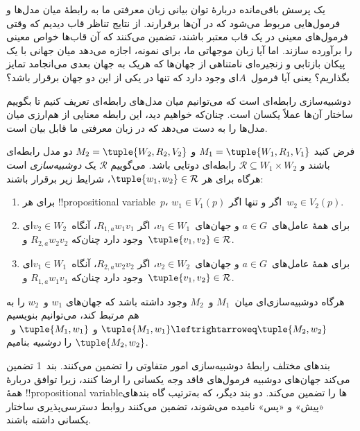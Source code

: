 \documentclass[../../../include/open-logic-section]{subfiles}
\begin{document}


یک پرسش باقی‌مانده دربارهٔ توان بیانی زبان معرفتی ما به رابطهٔ میان
مدل‌ها و فرمول‌هایی مربوط می‌شود که در آن‌ها برقرارند. از نتایج تناظر
قاب دیدیم که وقتی فرمول‌های معینی در یک قاب معتبر باشند، تضمین می‌کنند
که آن قاب‌ها خواص معینی را برآورده سازند. اما آیا زبان موجهاتی ما، برای
نمونه، اجازه می‌دهد میان جهانی با یک پیکان بازتابی و زنجیره‌ای نامتناهی
از جهان‌ها که هریک به جهان بعدی می‌انجامد تمایز بگذاریم؟ یعنی آیا
فرمول~$A$ای وجود دارد که تنها در یکی از این دو جهان برقرار باشد؟

دوشبیه‌سازی رابطه‌ای است که می‌توانیم میان مدل‌های رابطه‌ای تعریف کنیم
تا بگوییم ساختار آن‌ها عملاً یکسان است. چنان‌که خواهیم دید، این رابطه
معنایی از هم‌ارزی میان مدل‌ها را به دست می‌دهد که در زبان معرفتی ما
قابل بیان است.

\begin{defn}
فرض کنید $M_1 = \tuple{W_1, R_1, V_1}$ و
$M_2 = \tuple{W_2, R_2, V_2}$ دو مدل رابطه‌ای باشند و
$\mathcal{R} \subseteq W_1 \times W_2$ رابطه‌ای دوتایی باشد. می‌گوییم
$\mathcal{R}$ یک \emph{دوشبیه‌سازی} است هرگاه برای هر
$\tuple{w_1, w_2} \in \mathcal{R}$، شرایط زیر برقرار باشند:

\begin{enumerate}
  \item برای هر !!{propositional variable}~$p$،
  $w_1 \in V_1(p)$ اگر و تنها اگر~$w_2 \in V_2(p)$.
  \item برای همهٔ عامل‌های~$a \in G$ و جهان‌های~$v_1 \in W_1$، اگر
  $R_{1,a} w_1 v_1$، آنگاه~$v_2 \in W_2$ای وجود دارد چنان‌که
  $R_{2,a} w_2 v_2$ و~$\tuple{v_1, v_2} \in \mathcal{R}$.
  \item برای همهٔ عامل‌های~$a \in G$ و جهان‌های~$v_2 \in W_2$، اگر
   $R_{2,a} w_2 v_2$، آنگاه~$v_1 \in W_1$ای وجود دارد چنان‌که
   $R_{1,a} w_1 v_1$ و~$\tuple{v_1, v_2} \in \mathcal{R}$.
\end{enumerate}

هرگاه دوشبیه‌سازی‌ای میان~$M_1$ و~$M_2$ وجود داشته باشد که جهان‌های
$w_1$ و~$w_2$ را به هم مرتبط کند، می‌توانیم بنویسیم
$\tuple{M_1, w_1} \leftrightarroweq \tuple{M_2, w_2}$ و
$\tuple{M_1, w_1}$ و~$\tuple{M_2, w_2}$ را \emph{دوشبیه} بنامیم.
\end{defn}

بندهای مختلف رابطهٔ دوشبیه‌سازی امور متفاوتی را تضمین می‌کنند. بند~1
تضمین می‌کند جهان‌های دوشبیه فرمول‌های فاقد وجه یکسانی را ارضا کنند،
زیرا توافق دربارهٔ همهٔ !!{propositional variable}ها را تضمین می‌کند.
دو بند دیگر، که به‌ترتیب گاه بندهای «پیش» و «پس» نامیده می‌شوند، تضمین
می‌کنند روابط دسترسی‌پذیری ساختار یکسانی داشته باشند.
\end{document}
